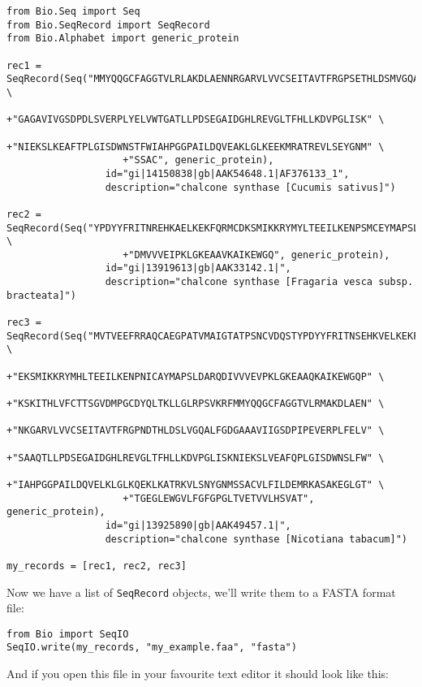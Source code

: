 \documentclass{report}
\begin{document}
\begin{verbatim}
from Bio.Seq import Seq
from Bio.SeqRecord import SeqRecord
from Bio.Alphabet import generic_protein

rec1 = SeqRecord(Seq("MMYQQGCFAGGTVLRLAKDLAENNRGARVLVVCSEITAVTFRGPSETHLDSMVGQALFGD" \
                    +"GAGAVIVGSDPDLSVERPLYELVWTGATLLPDSEGAIDGHLREVGLTFHLLKDVPGLISK" \
                    +"NIEKSLKEAFTPLGISDWNSTFWIAHPGGPAILDQVEAKLGLKEEKMRATREVLSEYGNM" \
                    +"SSAC", generic_protein),
                 id="gi|14150838|gb|AAK54648.1|AF376133_1",
                 description="chalcone synthase [Cucumis sativus]")

rec2 = SeqRecord(Seq("YPDYYFRITNREHKAELKEKFQRMCDKSMIKKRYMYLTEEILKENPSMCEYMAPSLDARQ" \
                    +"DMVVVEIPKLGKEAAVKAIKEWGQ", generic_protein),
                 id="gi|13919613|gb|AAK33142.1|",
                 description="chalcone synthase [Fragaria vesca subsp. bracteata]")

rec3 = SeqRecord(Seq("MVTVEEFRRAQCAEGPATVMAIGTATPSNCVDQSTYPDYYFRITNSEHKVELKEKFKRMC" \
                    +"EKSMIKKRYMHLTEEILKENPNICAYMAPSLDARQDIVVVEVPKLGKEAAQKAIKEWGQP" \
                    +"KSKITHLVFCTTSGVDMPGCDYQLTKLLGLRPSVKRFMMYQQGCFAGGTVLRMAKDLAEN" \
                    +"NKGARVLVVCSEITAVTFRGPNDTHLDSLVGQALFGDGAAAVIIGSDPIPEVERPLFELV" \
                    +"SAAQTLLPDSEGAIDGHLREVGLTFHLLKDVPGLISKNIEKSLVEAFQPLGISDWNSLFW" \
                    +"IAHPGGPAILDQVELKLGLKQEKLKATRKVLSNYGNMSSACVLFILDEMRKASAKEGLGT" \
                    +"TGEGLEWGVLFGFGPGLTVETVVLHSVAT", generic_protein),
                 id="gi|13925890|gb|AAK49457.1|",
                 description="chalcone synthase [Nicotiana tabacum]")
               
my_records = [rec1, rec2, rec3]
\end{verbatim}

\noindent Now we have a list of \verb|SeqRecord| objects, we'll write them to a FASTA format file:

\begin{verbatim}
from Bio import SeqIO
SeqIO.write(my_records, "my_example.faa", "fasta")
\end{verbatim}

\noindent And if you open this file in your favourite text editor it should look like this:
\end{document}
